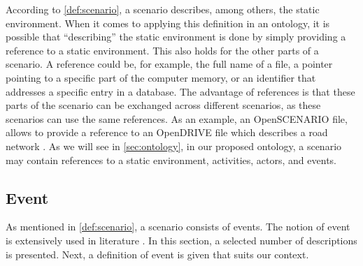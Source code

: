 \cbstartb
According to \cref{def:scenario}, a scenario describes, among others, the static environment. 
When it comes to applying this definition in an ontology, it is possible that ``describing'' the static environment is done by simply providing a reference to a static environment. 
This also holds for the other parts of a scenario. 
\cbstartd
A reference could be, for example, the full name of a file, a pointer pointing to a specific part of the computer memory, or an identifier that addresses a specific entry in a database.
\cbstartc 
The advantage of references is that these parts of the scenario can be exchanged across different scenarios, as these scenarios can use the same references. 
\cbend
As an example, an OpenSCENARIO file, allows to provide a reference to an OpenDRIVE file which describes a road network \cite{dupuis2010opendrive}. As we will see in \cref{sec:ontology}, in our proposed ontology, a scenario may contain references to a static environment, activities, actors, and events.
\cbend



\subsection{Event}
\label{sec:event}
As mentioned in \cref{def:scenario}, a scenario consists of events. The notion of event is extensively used in literature \cite{breu1997towards, pfeiffer2013concepts, branicky1998hybridcontrol, deschutter2000optimal, heemels2012eventcontrol}. In this section, a selected number of descriptions is presented. Next, a definition of event is given that suits our context.

